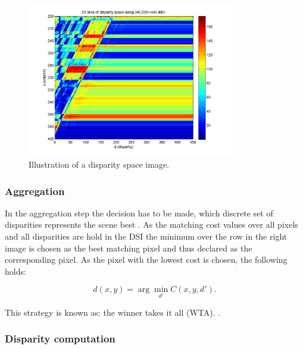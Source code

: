 \begin{figure}[h!]
  \centering
  \includegraphics[width=0.8\textwidth]{src/images/dsi.png}
  \caption[Disparity space image]{Illustration of a disparity space image.\protect\footnotemark}
  \label{fig:dsi}
\end{figure}

\subsubsection{Aggregation}

In the aggregation step the decision has to be made, which discrete set of disparities represents the scene best \citep{scharstein2002taxonomy}.
As the matching cost values over all pixels and all disparities are hold in the DSI the minimum over the row in the right image is chosen as the best matching pixel and thus declared as the corresponding pixel.
As the pixel with the lowest cost is chosen, the following holds:

\begin{equation}
  d(x,y) = \arg\min_{d'} C(x,y,d').
\end{equation}

\noindent This strategy is known as: the winner takes it all (WTA). \citep{cyganek2011introduction, scharstein2002taxonomy}.

\subsubsection{Disparity computation}

